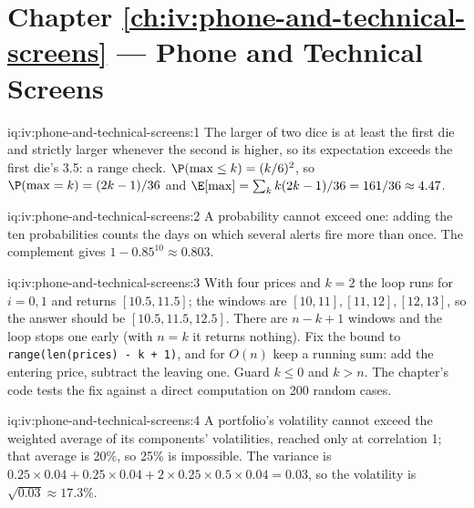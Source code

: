 \section*{Chapter \ref{ch:iv:phone-and-technical-screens} --- Phone and Technical Screens}

\begin{solution}{iq:iv:phone-and-technical-screens:1}
The larger of two dice is at least the first die and strictly larger whenever the second is higher, so its
expectation exceeds the first die's 3.5: a range check. $\P(\max \le k) = (k/6)^2$, so $\P(\max = k) = (2k -
1)/36$ and $\E[\max] = \sum_k k(2k-1)/36 = 161/36 \approx 4.47$.
\end{solution}

\begin{solution}{iq:iv:phone-and-technical-screens:2}
A probability cannot exceed one: adding the ten probabilities counts the days on which several alerts fire
more than once. The complement gives $1 - 0.85^{10} \approx 0.803$.
\end{solution}

\begin{solution}{iq:iv:phone-and-technical-screens:3}
With four prices and $k = 2$ the loop runs for $i = 0, 1$ and returns $[10.5, 11.5]$; the windows are
$[10, 11], [11, 12], [12, 13]$, so the answer should be $[10.5, 11.5, 12.5]$. There are $n - k + 1$ windows
and the loop stops one early (with $n = k$ it returns nothing). Fix the bound to \texttt{range(len(prices) - k
+ 1)}, and for $O(n)$ keep a running sum: add the entering price, subtract the leaving one. Guard $k \le 0$
and $k > n$. The chapter's code tests the fix against a direct computation on 200 random cases.
\end{solution}

\begin{solution}{iq:iv:phone-and-technical-screens:4}
A portfolio's volatility cannot exceed the weighted average of its components' volatilities, reached only at
correlation 1; that average is 20\%, so 25\% is impossible. The variance is $0.25 \times 0.04 + 0.25 \times
0.04 + 2 \times 0.25 \times 0.5 \times 0.04 = 0.03$, so the volatility is $\sqrt{0.03} \approx 17.3\%$.
\end{solution}

